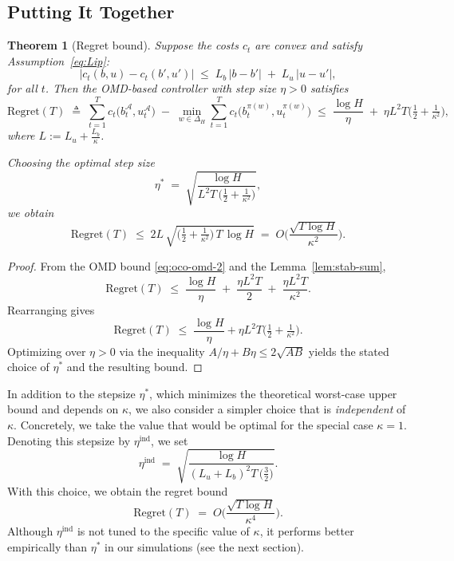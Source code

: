 \documentclass[11pt]{article}
\newtheorem{Thm:Theorem}{Theorem}
\begin{document}
\subsection{Putting It Together}

\begin{Thm:Theorem}[Regret bound]
\label{thm:regret}
Suppose the costs \(c_t\) are convex and satisfy Assumption~\ref{eq:Lip}:
\begin{equation*}
  \big|c_t(b,u) - c_t(b',u')\big|
  \;\leq\;
  L_b \,|b-b'| \;+\; L_u \,|u-u'| ,
\end{equation*}
for all \(t\). Then the OMD-based controller with step size \(\eta>0\) satisfies
\[
  \mathrm{Regret}(T)
  \;\triangleq\;
  \sum_{t=1}^T c_t\big(b_t^\mathcal{A},u_t^\mathcal{A}\big)
  \;-\;
  \min_{w\in\Delta_H}\sum_{t=1}^T c_t\!\big(b_t^{\pi(w)},u_t^{\pi(w)}\big)
  \;\le\;
  \frac{\log H}{\eta} \;+\; \eta L^2 T\Big(\tfrac{1}{2} + \tfrac{1}{\kappa^2}\Big),
\]
where \(L := L_u + \tfrac{L_b}{\kappa}\).

Choosing the optimal step size
\[
  \eta^*
  \;=\;
  \sqrt{\frac{\log H}{L^2 T \,\big(\tfrac{1}{2}+\tfrac{1}{\kappa^2}\big)}},
\]
we obtain
\[
  \mathrm{Regret}(T)
  \;\le\;
  2L\,\sqrt{\Big(\tfrac{1}{2}+\tfrac{1}{\kappa^2}\Big)\,T\,\log H}
  \;=\;
  O\!\Big(
  \frac{\sqrt{T\log H}}{\kappa^2}
  \Big).
\]
\end{Thm:Theorem}


\begin{proof}
From the OMD bound \eqref{eq:oco-omd-2} and the Lemma~\ref{lem:stab-sum},
\[
\mathrm{Regret}(T)
\;\le\;
\frac{\log H}{\eta}
\;+\;
\frac{\eta L^2 T}{2}
\;+\;
\frac{\eta L^2 T}{\kappa^2}.
\]
Rearranging gives
\[
\mathrm{Regret}(T)
\;\le\;
\frac{\log H}{\eta} + \eta L^2 T\Big(\tfrac{1}{2}+\tfrac{1}{\kappa^2}\Big).
\]
Optimizing over \(\eta > 0\) via the inequality \(A/\eta + B\eta \le 2\sqrt{AB}\) yields the stated choice of \(\eta^*\) and the resulting bound.
\end{proof}

In addition to the stepsize \(\eta^*\), which minimizes the theoretical worst-case upper bound and depends on \(\kappa\), we also consider a simpler choice that is \emph{independent} of \(\kappa\). Concretely, we take the value that would be optimal for the special case \(\kappa = 1\). Denoting this stepsize by \(\eta^{\mathrm{ind}}\), we set
\[
  \eta^{\mathrm{ind}}
  \;=\;
  \sqrt{\frac{\log H}{(L_u+L_b)^2 T \,\big(\tfrac{3}{2}\big)}}.
\]
With this choice, we obtain the regret bound
\[
  \mathrm{Regret}(T)
  \;=\;
  O\!\Big(
    \frac{\sqrt{T \log H}}{\kappa^4}
  \Big).
\]
Although \(\eta^{\mathrm{ind}}\) is not tuned to the specific value of \(\kappa\), it performs better empirically than \(\eta^*\) in our simulations (see the next section).
\end{document}
